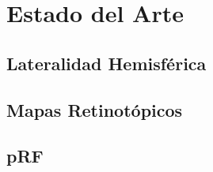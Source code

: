 \chapter{Estado del Arte}\label{chapter:state-of-the-art}

\section*{Lateralidad Hemisf\'erica}
\section*{Mapas Retinot\'opicos}
\section*{pRF}
